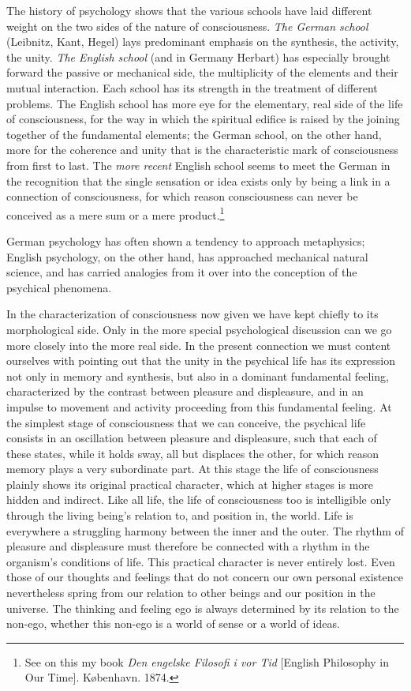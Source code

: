 \documentclass[12pt,a4paper]{book}
\newcommand{\opage}[1]{\marginnote{\footnotesize\textit{[#1]}}}
\begin{document}
The history of psychology shows that the various schools have laid
different weight on the two sides of the nature of consciousness.
\emph{The German school} (Leibnitz, Kant, Hegel) lays predominant
emphasis on the synthesis, the activity, the unity. \emph{The English
school} (and in Germany Herbart) has especially brought forward the
passive or mechanical side, the multiplicity of the elements and their
mutual interaction. Each school has its strength in the treatment of
different problems. The English school has more eye for the elementary,
real side of the life of consciousness, for the way in which the
spiritual edifice is raised by the joining together of the fundamental
elements; the German school, on the other hand, more for the coherence
and unity that is the characteristic mark of consciousness from first
to last. The \emph{more recent} English school seems to meet the German
in the
\opage{60}recognition that the single sensation or idea exists only by
being a link in a connection of consciousness, for which reason
consciousness can never be conceived as a mere sum or a mere
product.\footnote{See on this my book \textit{Den engelske Filosofi i
vor Tid} [English Philosophy in Our Time]. København. 1874.}

German psychology has often shown a tendency to approach metaphysics;
English psychology, on the other hand, has approached mechanical natural
science, and has carried analogies from it over into the conception of
the psychical phenomena.

In the characterization of consciousness now given we have kept chiefly
to its morphological side. Only in the more special psychological
discussion can we go more closely into the more real side. In the
present connection we must content ourselves with pointing out that the
unity in the psychical life has its expression not only in memory and
synthesis, but also in a dominant fundamental feeling, characterized by
the contrast between pleasure and displeasure, and in an impulse to
movement and activity proceeding from this fundamental feeling. At the
simplest stage of consciousness that we can conceive, the psychical life
consists in an oscillation between pleasure and displeasure, such that
each of these states, while it holds sway, all but displaces the other,
for which reason memory plays a very subordinate part. At this stage
the life of consciousness plainly shows its original practical
character, which at higher stages is more hidden and indirect. Like all
life, the life of consciousness too is intelligible only through the
living being's relation to, and position in, the world. Life is
everywhere a struggling harmony between the inner and the outer. The
rhythm of pleasure and displeasure must therefore be connected with a
rhythm in the organism's conditions of life. This practical character
is never entirely lost. Even those of our thoughts and feelings that do
not concern our own personal existence nevertheless spring from our
relation to other beings and our position in the universe. The thinking
and feeling ego is always determined by its relation to the non-ego,
whether this non-ego is a world of sense or a world of ideas.
\end{document}
